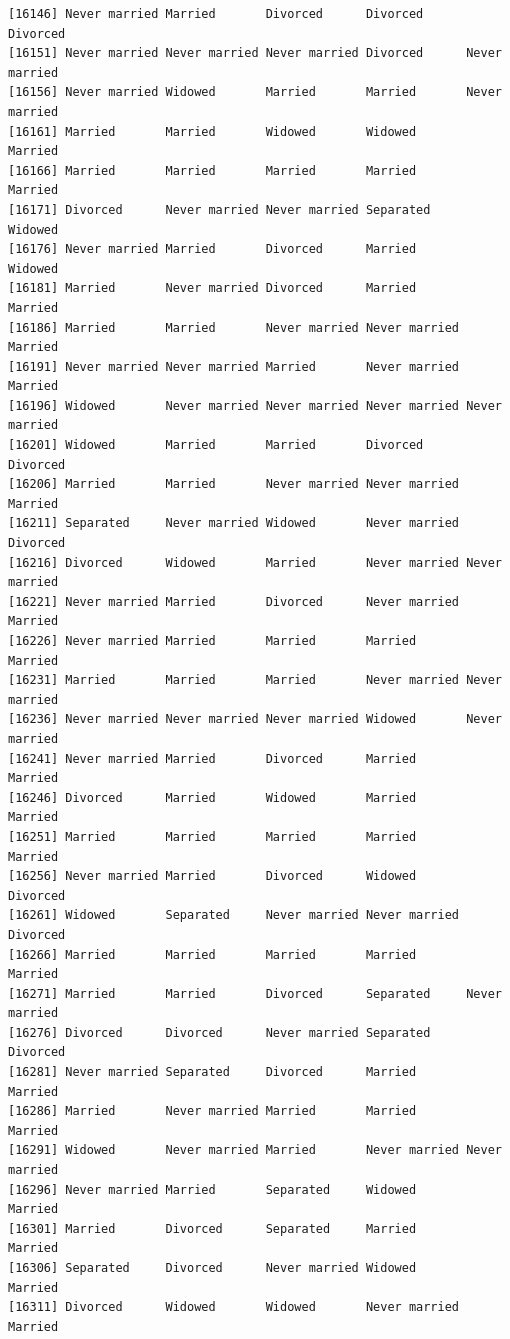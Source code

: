 \documentclass[
  letterpaper,
  DIV=11,
  numbers=noendperiod,
  oneside]{scrartcl}
\begin{document}
\begin{verbatim}
[16146] Never married Married       Divorced      Divorced      Divorced     
[16151] Never married Never married Never married Divorced      Never married
[16156] Never married Widowed       Married       Married       Never married
[16161] Married       Married       Widowed       Widowed       Married      
[16166] Married       Married       Married       Married       Married      
[16171] Divorced      Never married Never married Separated     Widowed      
[16176] Never married Married       Divorced      Married       Widowed      
[16181] Married       Never married Divorced      Married       Married      
[16186] Married       Married       Never married Never married Married      
[16191] Never married Never married Married       Never married Married      
[16196] Widowed       Never married Never married Never married Never married
[16201] Widowed       Married       Married       Divorced      Divorced     
[16206] Married       Married       Never married Never married Married      
[16211] Separated     Never married Widowed       Never married Divorced     
[16216] Divorced      Widowed       Married       Never married Never married
[16221] Never married Married       Divorced      Never married Married      
[16226] Never married Married       Married       Married       Married      
[16231] Married       Married       Married       Never married Never married
[16236] Never married Never married Never married Widowed       Never married
[16241] Never married Married       Divorced      Married       Married      
[16246] Divorced      Married       Widowed       Married       Married      
[16251] Married       Married       Married       Married       Married      
[16256] Never married Married       Divorced      Widowed       Divorced     
[16261] Widowed       Separated     Never married Never married Divorced     
[16266] Married       Married       Married       Married       Married      
[16271] Married       Married       Divorced      Separated     Never married
[16276] Divorced      Divorced      Never married Separated     Divorced     
[16281] Never married Separated     Divorced      Married       Married      
[16286] Married       Never married Married       Married       Married      
[16291] Widowed       Never married Married       Never married Never married
[16296] Never married Married       Separated     Widowed       Married      
[16301] Married       Divorced      Separated     Married       Married      
[16306] Separated     Divorced      Never married Widowed       Married      
[16311] Divorced      Widowed       Widowed       Never married Married      

\end{verbatim}
\end{document}

